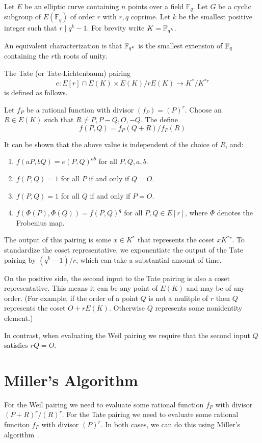 Let $E$ be an elliptic curve containing $n$ points over a field $\mathbb{F}_q$.
Let $G$ be a cyclic subgroup of $E(\mathbb{F}_q)$ of order $r$ with $r, q$
coprime. Let $k$ be the smallest positive integer such that $r \mid q^k - 1$.
For brevity write $K = \mathbb{F}_{q^k}$.

An equivalent characterization is that
$\mathbb{F}_{q^k}$ is the smallest extension of $\mathbb{F}_q$ containing the $r$th roots of unity.

The Tate (or Tate-Lichtenbaum) pairing
\[
e : E[r] \cap E(K) \times
E(K) / r E(K) \rightarrow
K^* / K^{*r}
\]
is defined as follows.

Let $f_P$ be a rational function with divisor $(f_P) = (P)^r$.
Choose an $R\in E(K)$ such that $R \ne P, P-Q, O, -Q$. The define
\[
f(P, Q) = f_P (Q + R) / f_P (R)
\]

It can be shown that the above value is independent of the choice of $R$,
and:
\begin{enumerate}
\item
$f(a P, b Q) = e(P, Q)^{a b}$ for all $P, Q, a, b$.
\item
$f(P,Q) = 1$ for all $P$ if and only if $Q = O$.
\item
$f(P,Q) = 1$ for all $Q$ if and only if $P = O$.
\item
$f(\Phi(P),\Phi(Q)) = f(P,Q)^{q}$ for all $P,Q \in E[r]$,
where $\Phi$ denotes the Frobenius map.
\end{enumerate}

The output of this pairing is some $x \in K^*$
that represents the coset $x K^{*r}$. To standardize the coset
representative, we exponentiate the output of the Tate pairing
by $(q^k - 1) / r$, which can take a substantial amount of time.

On the positive side, the second input to the Tate pairing is also a coset
representative. This means it can be any point of $E(K)$ and may
be of any order. (For example,
if the order of a point $Q$ is not a mulitple of $r$ then $Q$ represents
the coset $O + r E(K)$. Otherwise $Q$ represents some nonidentity
element.)

In contrast, when evaluating the Weil pairing we require that the second
input $Q$ satisfies $r Q = O$.

\section {Miller's Algorithm}

For the Weil pairing we need to evaluate some rational function
$f_P$ with divisor $(P+R)^r /(R)^r$.
For the Tate pairing we need to evaluate some rational funciton
$f_P$ with divisor $(P)^r$.
In both cases, we can do this using Miller's algorithm~\cite{miller}.

